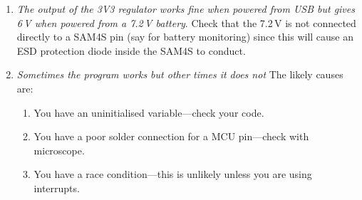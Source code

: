 \begin{enumerate}
\item
  \emph{The output of the 3V3 regulator works fine when powered from
    USB but gives 6\,V when powered from a 7.2\,V battery}. Check that
  the 7.2\,V is not connected directly to a SAM4S pin (say for battery
  monitoring) since this will cause an ESD protection diode inside the
  SAM4S to conduct.

\item \emph{Sometimes the program works but other times it does not}
  The likely causes are:
  \begin{enumerate}
  \item You have an uninitialised variable---check your code.

  \item You have a poor solder connection for a MCU pin---check with
    microscope.

  \item You have a race condition---this is unlikely unless you are
    using interrupts.
  \end{enumerate}

\end{enumerate}
